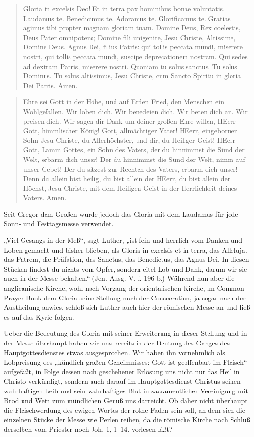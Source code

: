 \begin{quote}
Gloria in excelsis Deo! Et in terra pax hominibus bonae voluntatis. Laudamus te. Benedicimus te. Adoramus te. Glorificamus te. Gratias agimus tibi propter magnam gloriam tuam. Domine Deus, Rex coelestis, Deus Pater omnipotens; Domine fili unigenite, Jesu Christe, Altissime, Domine Deus. Agnus Dei, filius Patris: qui tollis peccata mundi, miserere nostri, qui tollis peccata mundi, suscipe deprecationem nostram. Qui sedes ad dextram Patris, miserere nostri. Quoniam tu solus sanctus. Tu solus Dominus. Tu solus altissimus, Jesu Christe, cum Sancto Spiritu in gloria Dei Patris. Amen.
\end{quote}

\begin{quote}
Ehre sei Gott in der Höhe, und auf Erden Fried, den Menschen ein Wohlgefallen. Wir loben dich. Wir benedeien dich. Wir beten dich an. Wir preisen dich. Wir sagen dir Dank um deiner großen Ehre willen, HEerr Gott, himmlischer König! Gott, allmächtiger Vater! HEerr, eingeborner Sohn Jesu Christe, du Allerhöchster, und dir, du Heiliger Geist! HEerr Gott, Lamm Gottes, ein Sohn des Vaters, der du hinnimmst die Sünd der Welt, erbarm dich unser! Der du hinnimmst die Sünd der Welt, nimm auf unser Gebet! Der du sitzest zur Rechten des Vaters, erbarm dich unser! Denn du allein bist heilig, du bist
allein der HEerr, du bist allein der Höchst, Jesu Christe, mit dem Heiligen Geist in der Herrlichkeit deines Vaters. Amen.
\end{quote}

Seit Gregor dem Großen wurde jedoch das Gloria mit dem Laudamus für jede Sonn- und Festtagsmesse verwendet.

„Viel Gesangs in der Meß“, sagt Luther, „ist fein und herrlich vom Danken und Loben gemacht und bisher blieben, als Gloria in excelsis et in terra, das Alleluja, das Patrem, die Präfation, das Sanctus, das Benedictus, das Agnus Dei. In diesen Stücken findest du nichts vom Opfer, sondern eitel Lob und Dank, darum wir sie auch in der Messe behalten.“ (Jen. Ausg. V, f. 196 b.) Während nun aber die anglicanische Kirche, wohl nach Vorgang der orientalischen Kirche, im Common Prayer-Book dem Gloria seine Stellung nach der Consecration, ja sogar nach der Austheilung anwies, schloß sich Luther auch hier der römischen Messe an und ließ es auf das Kyrie folgen.

Ueber die Bedeutung des Gloria mit seiner Erweiterung in dieser Stellung und in der Messe überhaupt haben wir uns bereits in der Deutung des Ganges des Hauptgottesdienstes etwas ausgesprochen. Wir haben ihn vornehmlich als Lobpreisung des „kündlich großen Geheimnisses: Gott ist geoffenbart im Fleisch“ aufgefaßt, in Folge dessen nach geschehener Erlösung uns nicht nur das Heil in Christo verkündigt, sondern auch darauf im Hauptgottesdienst Christus seinen wahrhaftigen Leib und sein wahrhaftiges Blut in sacramentlicher Vereinigung mit Brod und Wein zum mündlichen Genuß uns darreicht. Ob daher nicht überhaupt die Fleischwerdung des ewigen Wortes der rothe Faden sein soll, an dem sich die einzelnen Stücke der Messe wie Perlen reihen, da die römische Kirche nach Schluß derselben vom Priester noch Joh. 1, 1–14. vorlesen läßt?


